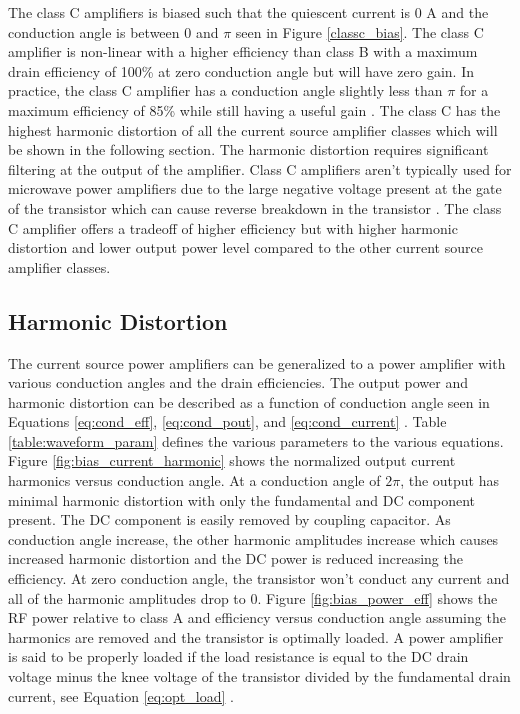 The class C amplifiers is biased such that the quiescent current is 0 A and the conduction angle is between $0$ and $\pi$ seen in Figure \ref{classc_bias}. The class C amplifier is non-linear with a higher efficiency than class B with a maximum drain efficiency of 100\% at zero conduction angle but will have zero gain. In practice, the class C amplifier has a conduction angle slightly less than $\pi$ for a maximum efficiency of 85\% while still having a useful gain \cite{Raab2003}. The class C has the highest harmonic distortion of all the current source amplifier classes which will be shown in the following section. The harmonic distortion requires significant filtering at the output of the amplifier. Class C amplifiers aren't typically used for microwave power amplifiers due to the large negative voltage present at the gate of the transistor which can cause reverse breakdown in the transistor \cite{C.Cripps2006}. The class C amplifier offers a tradeoff of higher efficiency but with higher harmonic distortion and lower output power level compared to the other current source amplifier classes.

\subsection{Harmonic Distortion}

The current source power amplifiers can be generalized to a power amplifier with various conduction angles and the drain efficiencies. The  output power and harmonic distortion can be described as a function of conduction angle seen in Equations \ref{eq:cond_eff}, \ref{eq:cond_pout}, and \ref{eq:cond_current} \cite{Hella}. Table \ref{table:waveform_param} defines the various parameters to the various equations. Figure \ref{fig:bias_current_harmonic} shows the normalized output current harmonics versus conduction angle. At a conduction angle of $2\pi$, the output has minimal harmonic distortion with only the fundamental and DC component  present. The DC component is easily removed by coupling capacitor. As conduction angle increase, the other harmonic amplitudes increase which causes increased harmonic distortion and the DC power is reduced increasing the efficiency. At zero conduction angle, the transistor won't conduct any current and all of the harmonic amplitudes drop to 0. Figure \ref{fig:bias_power_eff} shows the RF power relative to class A and efficiency versus conduction angle assuming the harmonics are removed and the transistor is optimally loaded. A power amplifier is said to be properly loaded if the load resistance is equal to the DC drain voltage minus the knee voltage of the transistor divided by the fundamental drain current, see Equation \ref{eq:opt_load} \cite{Hella}.

